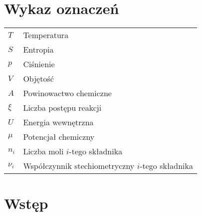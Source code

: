 \documentclass[10pt, a4paper, twoside, onecolumn]{article}
\numberwithin{equation}{section}
\begin{document}
	\section*{Wykaz oznaczeń}
	\setlength{\parindent}{0cm}
	\begin{table}[H]
	\begin{tabular}{@{} ll}
		\(T\) & Temperatura \\
		\(S\) & Entropia \\
		\(p\) & Ciśnienie \\
		\(V\) & Objętość \\
		\(A\) & Powinowactwo chemiczne \\
		\(\xi\) & Liczba postępu reakcji \\
		\(U\) & Energia wewnętrzna \\
		\(\mu\) & Potencjał chemiczny \\
		\(n_{i}\) & Liczba moli $i$-tego składnika \\
		\(\nu_{i}\) & Współczynnik stechiometryczny $i$-tego składnika
	\end{tabular}
	\end{table}
	\setlength{\parindent}{1.25cm}
	\pagebreak
	
	\section{Wstęp}
	
\end{document}
